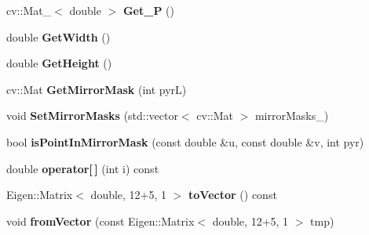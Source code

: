 \begin{DoxyCompactItemize}
\item 
cv\+::\+Mat\+\_\+$<$ double $>$ {\bfseries Get\+\_\+P} ()\hypertarget{classMultiColSLAM_1_1cCamModelGeneral___ab8ce26f84f99c06010fe3c9219f89913}{}\label{classMultiColSLAM_1_1cCamModelGeneral___ab8ce26f84f99c06010fe3c9219f89913}

\item 
double {\bfseries Get\+Width} ()\hypertarget{classMultiColSLAM_1_1cCamModelGeneral___a5e85acb2b4ba447d3b28f7f2b3a744c0}{}\label{classMultiColSLAM_1_1cCamModelGeneral___a5e85acb2b4ba447d3b28f7f2b3a744c0}

\item 
double {\bfseries Get\+Height} ()\hypertarget{classMultiColSLAM_1_1cCamModelGeneral___ac3dfa532576103cb38515d60c0e59c99}{}\label{classMultiColSLAM_1_1cCamModelGeneral___ac3dfa532576103cb38515d60c0e59c99}

\item 
cv\+::\+Mat {\bfseries Get\+Mirror\+Mask} (int pyrL)\hypertarget{classMultiColSLAM_1_1cCamModelGeneral___a252dfece3e794820e78afa2a6ec77887}{}\label{classMultiColSLAM_1_1cCamModelGeneral___a252dfece3e794820e78afa2a6ec77887}

\item 
void {\bfseries Set\+Mirror\+Masks} (std\+::vector$<$ cv\+::\+Mat $>$ mirror\+Masks\+\_\+)\hypertarget{classMultiColSLAM_1_1cCamModelGeneral___a3ea4d6fd99d2db89c6e9eb1e67f476d9}{}\label{classMultiColSLAM_1_1cCamModelGeneral___a3ea4d6fd99d2db89c6e9eb1e67f476d9}

\item 
bool {\bfseries is\+Point\+In\+Mirror\+Mask} (const double \&u, const double \&v, int pyr)\hypertarget{classMultiColSLAM_1_1cCamModelGeneral___aa1625a0b3a7fb2bd62e7f08a0215d076}{}\label{classMultiColSLAM_1_1cCamModelGeneral___aa1625a0b3a7fb2bd62e7f08a0215d076}

\item 
double {\bfseries operator\mbox{[}$\,$\mbox{]}} (int i) const \hypertarget{classMultiColSLAM_1_1cCamModelGeneral___ad69c9340067db19db86034f11f91eda4}{}\label{classMultiColSLAM_1_1cCamModelGeneral___ad69c9340067db19db86034f11f91eda4}

\item 
Eigen\+::\+Matrix$<$ double, 12+5, 1 $>$ {\bfseries to\+Vector} () const \hypertarget{classMultiColSLAM_1_1cCamModelGeneral___ac83caaf398a3bef3dbad982dfe2bbe9d}{}\label{classMultiColSLAM_1_1cCamModelGeneral___ac83caaf398a3bef3dbad982dfe2bbe9d}

\item 
void {\bfseries from\+Vector} (const Eigen\+::\+Matrix$<$ double, 12+5, 1 $>$ tmp)\hypertarget{classMultiColSLAM_1_1cCamModelGeneral___ad4213dbd3649990edb64ca4cb1e8fe5c}{}\label{classMultiColSLAM_1_1cCamModelGeneral___ad4213dbd3649990edb64ca4cb1e8fe5c}


\end{DoxyCompactItemize}

